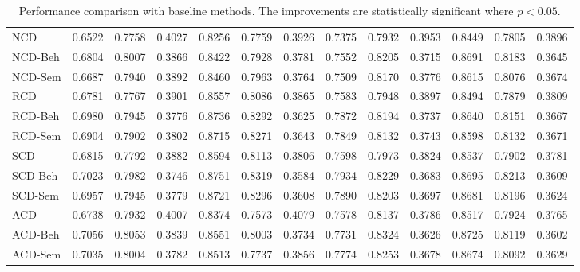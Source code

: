 \begin{table*}[tbp]
{\begin{tabular}{lcccccccccccc}
        \midrule
        NCD & 0.6522 & 0.7758 & 0.4027 & 0.8256 & 0.7759 & 0.3926   & 0.7375 & 0.7932 & 0.3953 & 0.8449 & 0.7805 & 0.3896\\ 
        NCD-Beh & 0.6804 & 0.8007 & 0.3866  &  0.8422 & 0.7928 & 0.3781 & 0.7552 & 0.8205 & 0.3715 & 0.8691 & 0.8183 & 0.3645\\
        NCD-Sem & 0.6687 & 0.7940 & 0.3892 &  0.8460 & 0.7963 & 0.3764 &0.7509 & 0.8170 & 0.3776 & 0.8615 & 0.8076 & 0.3674\\
        \midrule
        RCD & 0.6781 & 0.7767 & 0.3901 & 0.8557 & 0.8086 & 0.3865  & 0.7583 & 0.7948 & 0.3897 & 0.8494 & 0.7879 & 0.3809\\ 
        RCD-Beh & 0.6980 & 0.7945 & 0.3776 & 0.8736 & 0.8292 & 0.3625  & 0.7872 & 0.8194 & 0.3737 & 0.8640 & 0.8151 & 0.3667\\
        RCD-Sem & 0.6904 & 0.7902 & 0.3802 & 0.8715 & 0.8271 & 0.3643  & 0.7849 & 0.8132 & 0.3743 & 0.8598 & 0.8132 & 0.3671\\
        \midrule
        SCD & 0.6815 & 0.7792 & 0.3882 & 0.8594 & 0.8113 & 0.3806  & 0.7598 & 0.7973 & 0.3824 & 0.8537 & 0.7902 & 0.3781\\ 
        SCD-Beh & 0.7023 & 0.7982 & 0.3746 & 0.8751 & 0.8319 & 0.3584  & 0.7934 & 0.8229 & 0.3683 & 0.8695 & 0.8213 & 0.3609\\
        SCD-Sem & 0.6957 & 0.7945 & 0.3779 & 0.8721 & 0.8296 & 0.3608  & 0.7890 & 0.8203 & 0.3697 & 0.8681 & 0.8196 & 0.3624\\
        \midrule
        ACD & 0.6738 & 0.7932 & 0.4007 & 0.8374 & 0.7573 & 0.4079  & 0.7578 & 0.8137 & 0.3786 & 0.8517 & 0.7924 & 0.3765\\ 
        ACD-Beh & 0.7056 & 0.8053 & 0.3839 & 0.8551 & 0.8003 & 0.3734  & 0.7731 & 0.8324 & 0.3626 & 0.8725 & 0.8119 & 0.3602\\
        ACD-Sem & 0.7035 & 0.8004 & 0.3782 & 0.8513 & 0.7737 & 0.3856  &0.7774 & 0.8253 & 0.3678 & 0.8674 & 0.8092 & 0.3629\\
        
        \bottomrule
    \end{tabular}}
    \caption{Performance comparison with baseline methods. The improvements are statistically significant where $p<0.05$.
    }
    \label{tab:performance}
    \vspace{-1em}

\end{table*}








